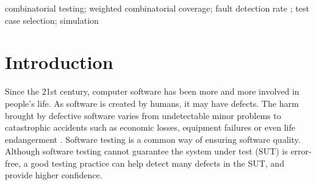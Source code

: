 \documentclass[10pt,conference, compsocconf]{IEEEtran}
\begin{document}
\begin{CJK}{UTF8}{gkai}
\begin{IEEEkeywords}
combinatorial testing; weighted combinatorial coverage; fault detection rate ; test case selection; simulation 
\end{IEEEkeywords}



\section{Introduction} Since the 21st century, computer software has been more
and more involved in people's life. As software is created by humans, it may
have defects. The harm brought by defective software varies from undetectable
minor problems to catastrophic accidents such as economic losses, equipment
failures or even life endangerment
\cite{tassey02NIST,ariane5,leveson93Computer}.  Software testing is a common way
of ensuring software quality. Although software testing cannot guarantee the
system under test (SUT) is error-free, a good testing practice can help detect
many defects in the SUT, and provide higher confidence.


\end{CJK}
\end{document}
